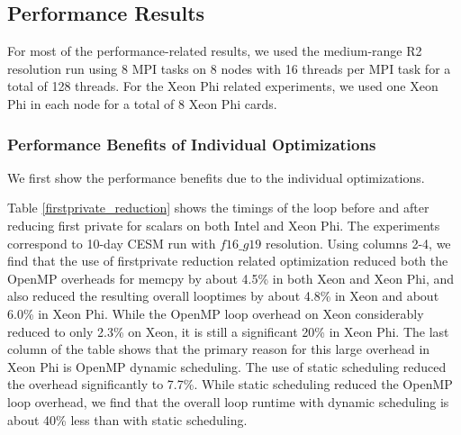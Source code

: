 \subsection{Performance Results}

For most of the performance-related results, we used the medium-range R2 resolution run using 8 MPI tasks on 8 nodes with 16 threads per MPI task for a total of 128 threads. For the Xeon Phi related experiments, we used one Xeon Phi in each node for a total of 8 Xeon Phi cards.

\subsubsection{Performance Benefits of Individual Optimizations}

We first show the performance benefits due to the individual optimizations.


Table \ref{firstprivate_reduction} shows the timings of the loop before and after reducing first private for scalars on both Intel and Xeon Phi. The experiments correspond to 10-day CESM run with $f16\_g19$ resolution. Using columns 2-4, we find that the use of firstprivate reduction related optimization reduced both the OpenMP overheads for memcpy by about 4.5\% in both Xeon and Xeon Phi, and also reduced the resulting overall looptimes by about 4.8\% in Xeon and about 6.0\% in Xeon Phi. While the OpenMP loop overhead on Xeon considerably reduced to only 2.3\% on Xeon, it is still a significant 20\% in Xeon Phi. The last column of the table shows that the primary reason for this large overhead in Xeon Phi is OpenMP dynamic scheduling. The use of static scheduling reduced the overhead significantly to 7.7\%.
While static scheduling reduced the OpenMP loop overhead, we find that the overall loop runtime with dynamic scheduling is about 40\% less than with static scheduling.

